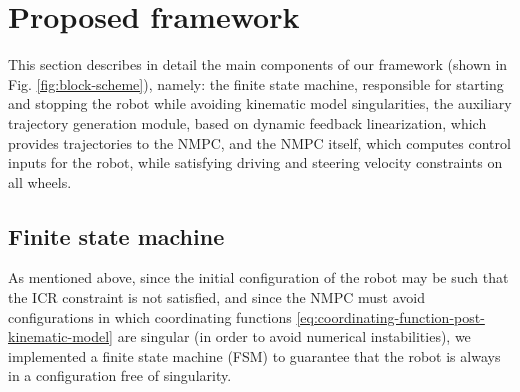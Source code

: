 \section{Proposed framework}
\label{sec:proposed-framework}
This section describes in detail the main components of our framework (shown in Fig. \ref{fig:block-scheme}), namely: the finite state machine, responsible for starting and stopping the robot while avoiding kinematic model singularities, the auxiliary trajectory generation module, based on dynamic feedback linearization, which provides trajectories to the NMPC, and the NMPC itself, which computes control inputs for the robot, while satisfying driving and steering velocity constraints on all wheels.

\subsection{Finite state machine}
\label{sec:finite-state-machine}
As mentioned above, since the initial configuration of the robot may be such that the ICR constraint is not satisfied, and since the NMPC must avoid configurations in which coordinating functions \eqref{eq:coordinating-function-post-kinematic-model} are singular (in order to avoid numerical instabilities), we implemented a finite state machine (FSM) to guarantee that the robot is always in a configuration free of singularity.


